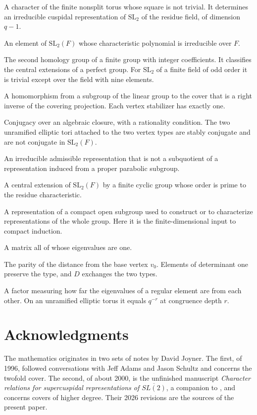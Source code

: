 \documentclass[12pt,letterpaper]{article}
\numberwithin{equation}{section}
\theoremstyle{definition}
\theoremstyle{remark}
\begin{document}
\begin{description}[style=nextline,leftmargin=1.5em]
\item[Regular character] A character of the finite nonsplit torus whose square is not trivial. It determines an irreducible cuspidal representation of $\mathrm{SL}_2$ of the residue field, of dimension $q-1$.
\item[Regular elliptic element] An element of $\mathrm{SL}_2(F)$ whose characteristic polynomial is irreducible over $F$.
\item[Schur multiplier] The second homology group of a finite group with integer coefficients. It classifies the central extensions of a perfect group. For $\mathrm{SL}_2$ of a finite field of odd order it is trivial except over the field with nine elements.
\item[Splitting] A homomorphism from a subgroup of the linear group to the cover that is a right inverse of the covering projection. Each vertex stabilizer has exactly one.
\item[Stable conjugacy] Conjugacy over an algebraic closure, with a rationality condition. The two unramified elliptic tori attached to the two vertex types are stably conjugate and are not conjugate in $\mathrm{SL}_2(F)$.
\item[Supercuspidal representation] An irreducible admissible representation that is not a subquotient of a representation induced from a proper parabolic subgroup.
\item[Tame cover] A central extension of $\mathrm{SL}_2(F)$ by a finite cyclic group whose order is prime to the residue characteristic.
\item[Type] A representation of a compact open subgroup used to construct or to characterize representations of the whole group. Here it is the finite-dimensional input to compact induction.
\item[Unipotent element] A matrix all of whose eigenvalues are one.
\item[Vertex type] The parity of the distance from the base vertex $v_0$. Elements of determinant one preserve the type, and $D$ exchanges the two types.
\item[Weyl discriminant] A factor measuring how far the eigenvalues of a regular element are from each other. On an unramified elliptic torus it equals $q^{-r}$ at congruence depth $r$.
\end{description}

\section*{Acknowledgments}
The mathematics originates in two sets of notes by David Joyner. The first, of 1996, followed conversations with Jeff Adams and Jason Schultz and concerns the twofold cover. The second, of about 2000, is the unfinished manuscript \emph{Character relations for supercuspidal representations of $\overline{SL(2)}$}, a companion to \cite{Jo99}, and concerns covers of higher degree. Their 2026 revisions \cite{Jo26a,Jo26b} are the sources of the present paper.
\end{document}
